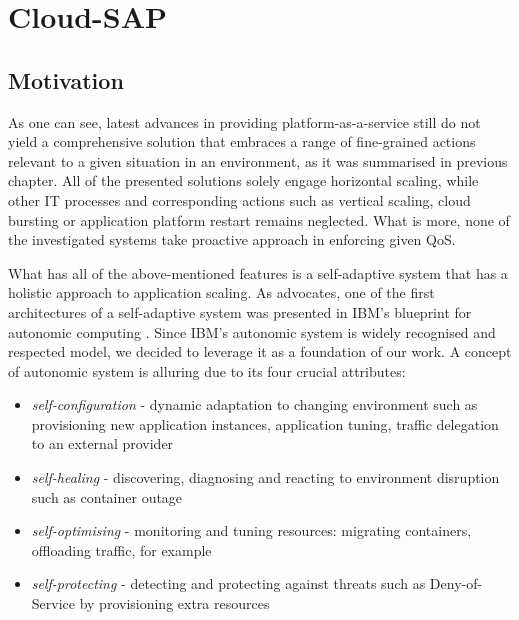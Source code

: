 \chapter{Cloud-SAP}


\section{Motivation}
As one can see, latest advances in providing platform-as-a-service still do not yield a comprehensive solution that embraces a range of fine-grained actions relevant to a given situation in an environment, as it was summarised in previous chapter. All of the presented solutions solely engage horizontal scaling, while other IT processes and corresponding actions such as vertical scaling, cloud bursting or application platform restart remains neglected. What is more, none of the investigated systems take proactive approach in enforcing given QoS.

What has all of the above-mentioned features is a self-adaptive system that has a holistic approach to application scaling. As \cite{brun2009engineering} advocates, one of the first architectures of a self-adaptive system was presented in IBM's blueprint for autonomic computing \cite{IBM06}. Since IBM's autonomic system is widely recognised and respected model, we decided to leverage it as a foundation of our work. A concept of autonomic system is alluring due to its four crucial attributes:
\begin{itemize}
 \item \emph{self-configuration} - dynamic adaptation to changing environment such as provisioning new application instances, application tuning, traffic delegation to an external provider
  \item \emph{self-healing} - discovering, diagnosing and reacting to environment disruption such as container outage
  \item \emph{self-optimising} - monitoring and tuning resources: migrating containers, offloading traffic, for example
  \item \emph{self-protecting} - detecting and protecting against threats such as Deny-of-Service by provisioning extra resources
\end{itemize}

